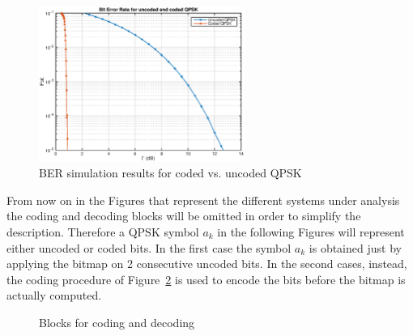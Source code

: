 \documentclass[10pt]{article}
\begin{document}
\begin{figure}
	\centering
	\includegraphics[width = 0.6\textwidth]{problem1}
	\caption{BER simulation results for coded vs. uncoded QPSK}
	\label{fig:problem1_pbit}
\end{figure}

From now on in the Figures that represent the different systems under analysis the coding and decoding blocks will be omitted in order to simplify the description. Therefore a QPSK symbol $a_k$ in the following Figures will represent either uncoded or coded bits. In the first case the symbol $a_k$ is obtained just by applying the bitmap on 2 consecutive uncoded bits. In the second cases, instead, the coding procedure of Figure~\ref{fig:code} is used to encode the bits before the bitmap is actually computed.

\begin{figure}[H]
	\centering
	\caption{Blocks for coding and decoding}
	\label{fig:code}
\end{figure}

\FloatBarrier
\end{document}
